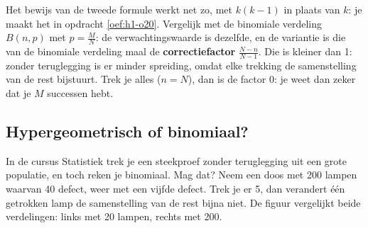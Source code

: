 Het bewijs van de tweede formule werkt net zo, met $k(k - 1)$ in plaats van $k$: je maakt het in opdracht \ref{oef:h1-o20}. Vergelijk met de binomiale verdeling $B(n, p)$ met $p = \frac{M}{N}$: de verwachtingswaarde is dezelfde, en de variantie is die van de binomiale verdeling maal de \textbf{correctiefactor} $\frac{N - n}{N - 1}$. Die is kleiner dan 1: zonder teruglegging is er minder spreiding, omdat elke trekking de samenstelling van de rest bijstuurt. Trek je alles ($n = N$), dan is de factor 0: je weet dan zeker dat je $M$ successen hebt.


\begin{oefeningen}
\end{oefeningen}

\subsection{Hypergeometrisch of binomiaal?}

In de cursus Statistiek trek je een steekproef zonder teruglegging uit een grote populatie, en toch reken je binomiaal. Mag dat? Neem een doos met 200 lampen waarvan 40 defect, weer met een vijfde defect. Trek je er 5, dan verandert één getrokken lamp de samenstelling van de rest bijna niet. De figuur vergelijkt beide verdelingen: links met 20 lampen, rechts met 200.

